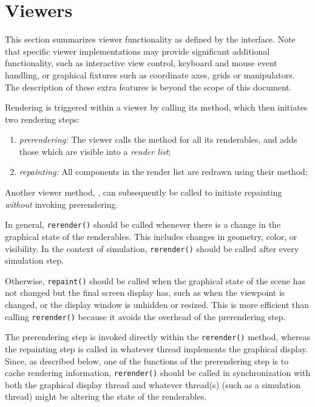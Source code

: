 \section{Viewers}
\label{viewers:sec}

This section summarizes viewer functionality as defined by the
 interface. Note that specific
viewer implementations may provide significant additional
functionality, such as interactive view control, keyboard and mouse
event handling, or graphical fixtures such as coordinate axes, grids
or manipulators. The description of these extra features is beyond the
scope of this document.

Rendering is triggered within a viewer by calling its
 method, which
then initiates two rendering steps:

\begin{enumerate}

\item {\it prerendering:} The viewer calls the
method for all its renderables, and adds those which
are visible into a {\it render list};

\item {\it repainting:} All components in the render list
are redrawn using their
 method;

\end{enumerate}

Another viewer method, ,
can subsequently be called to initiate repainting {\it without}
invoking prerendering.  

In general, {\tt rerender()} should be called whenever there is a
change in the graphical state of the renderables. This includes
changes in geometry, color, or visibility.  In the context of
simulation, {\tt rerender()} should be called after every simulation
step.

Otherwise, {\tt repaint()} should be called when the graphical state
of the scene has not changed but the final screen display has, such as
when the viewpoint is changed, or the display window is unhidden or
resized. This is more efficient than calling {\tt rerender()} because
it avoids the overhead of the prerendering step.

The prerendering step is invoked directly within the {\tt rerender()}
method, whereas the repainting step is called in whatever thread
implements the graphical display. Since, as described below, one of
the functions of the prerendering step is to cache rendering
information, {\tt rerender()} should be called in synchronization with both the
graphical display thread and whatever thread(s) (such as a simulation
thread) might be altering the state of the renderables.

